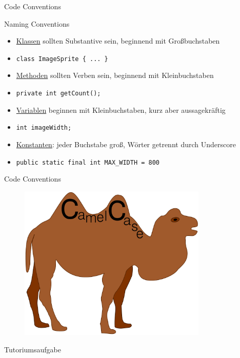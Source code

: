 \documentclass[18pt]{beamer}
\begin{document}
\begin{frame}[fragile]{Code Conventions}
        \begin{block}{Naming Conventions}
         \begin{itemize}
         \item \url{Klassen} sollten Substantive sein, beginnend mit Großbuchstaben
         \item[] \lstinline$class ImageSprite { ... }$
         \item \url{Methoden} sollten Verben sein, beginnend mit Kleinbuchstaben
         \item[] \lstinline$private int getCount();$
         \item \url{Variablen} beginnen mit Kleinbuchstaben, kurz aber aussagekräftig
         \item[] \lstinline$int imageWidth;$
         \item \url{Konstanten}: jeder Buchstabe groß, Wörter getrennt durch Underscore
         \item[] \lstinline$public static final int MAX_WIDTH = 800$
         \end{itemize}
        \end{block}
\end{frame}

\begin{frame}[fragile]{Code Conventions}
        \begin{figure}[ht]
        \centering
      \includegraphics[width=0.8\textwidth]{camelcase.png}
    \end{figure}
\end{frame}

\begin{frame}
Tutoriumsaufgabe
\end{frame}
\end{document}
